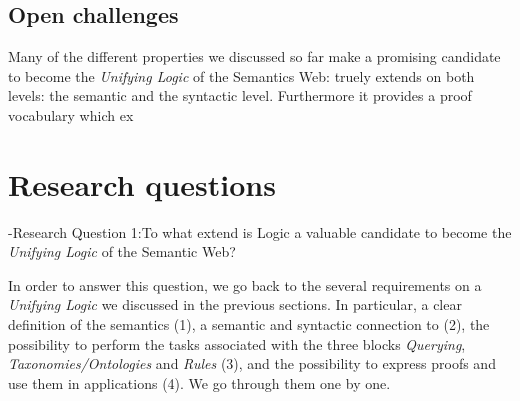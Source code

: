 \subsection{Open challenges}
Many of the different properties we discussed so far make \nthree a promising candidate to become the \emph{Unifying Logic} of the Semantics Web: \nthree truely extends \rdf on both 
levels: the semantic and the syntactic level. Furthermore it provides a proof vocabulary which ex



%
% 
% 
% 
% 
% 
% 
% 
%  

\section{Research questions}



\hyp{Research Question 1:}{To what extend is \nthree Logic a valuable candidate to become the \emph{Unifying Logic} of the Semantic Web?}

In order to answer this question, we go back to the several requirements on a \emph{Unifying Logic} we discussed in the previous sections. 
In particular,
a clear definition of the semantics (1), a semantic and syntactic connection to \rdf (2), the possibility to perform the tasks associated with 
the three blocks \emph{Querying}, \emph{Taxonomies/Ontologies}
and \emph{Rules} (3), and the possibility to express proofs and use them in applications (4). We go through them one by one.

